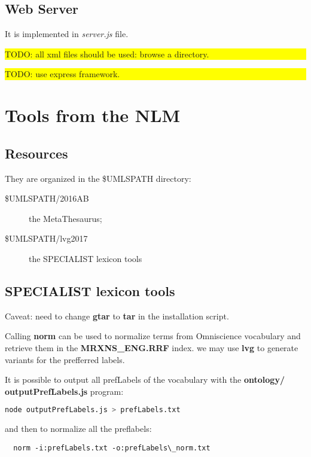 \documentclass[a4paper,11pt]{report}
\newcommand{\cs}[1]{{\bfseries \ttfamily #1}}
\newcommand{\TODO}[1]{\begin{center}\bfseries \colorbox{yellow}{\parbox{0.9\textwidth}{TODO: #1}}\end{center}}
\begin{document}
\section{Web Server}
It is implemented in \emph{server.js} file. 

\TODO{all xml files should be used: browse a directory.}

\TODO{use express framework.}
\chapter{Tools from the NLM}
\section{Resources}
They are organized in the \$UMLSPATH directory:
\begin{description}
\item[\$UMLSPATH/2016AB] the MetaThesaurus;
\item[\$UMLSPATH/lvg2017] the SPECIALIST lexicon tools
\end{description}

\section{SPECIALIST lexicon tools}
Caveat: need to change \cs{gtar} to \cs{tar} in the installation script.

Calling \cs{norm} can be used to normalize terms from Omniscience vocabulary and retrieve them in the \cs{MRXNS\_ENG.RRF} index. we may use \cs{lvg} to generate variants for the prefferred labels.

It is possible to output all prefLabels of the vocabulary with the \cs{ontology/
outputPrefLabels.js} program:
\begin{lstlisting}[language=bash]
  node outputPrefLabels.js > prefLabels.txt
\end{lstlisting}
and then to normalize all the preflabels:
\begin{lstlisting}
  norm -i:prefLabels.txt -o:prefLabels\_norm.txt
\end{lstlisting}
\end{document}
